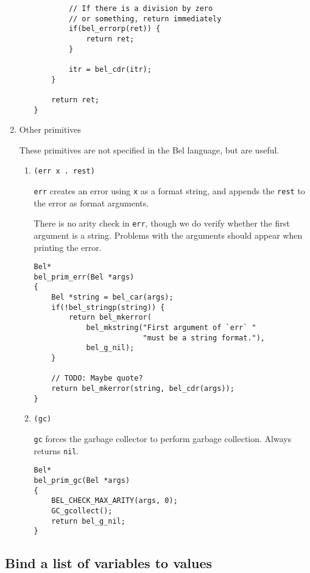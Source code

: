 \documentclass[openright,a4paper,twoside,12pt]{memoir}
\begin{document}
\begin{enumerate}
\begin{enumerate}
\begin{verbatim}
        // If there is a division by zero
        // or something, return immediately
        if(bel_errorp(ret)) {
            return ret;
        }
        
        itr = bel_cdr(itr);
    }

    return ret;
}
\end{verbatim}
\end{enumerate}

\item Other primitives
\label{sec:org4560922}

These primitives are not specified in the Bel language, but are useful.

\begin{enumerate}
\item \texttt{(err x . rest)}
\label{sec:orgdc2a7fe}

\texttt{err} creates an error using \texttt{x} as a format string, and appends the \texttt{rest}
to the error as format arguments.

There is no arity check in \texttt{err}, though we do verify whether the first
argument is a string. Problems with the arguments should appear when
printing the error.

\begin{verbatim}
Bel*
bel_prim_err(Bel *args)
{
    Bel *string = bel_car(args);
    if(!bel_stringp(string)) {
        return bel_mkerror(
            bel_mkstring("First argument of `err` "
                         "must be a string format."),
            bel_g_nil);
    }

    // TODO: Maybe quote?
    return bel_mkerror(string, bel_cdr(args));
}
\end{verbatim}

\item \texttt{(gc)}
\label{sec:orgecaa835}

\texttt{gc}    forces    the    garbage   collector    to    perform    garbage
collection. Always returns \texttt{nil}.

\begin{verbatim}
Bel*
bel_prim_gc(Bel *args)
{
    BEL_CHECK_MAX_ARITY(args, 0);
    GC_gcollect();
    return bel_g_nil;
}
\end{verbatim}
\end{enumerate}
\end{enumerate}

\subsection{Bind a list of variables to values}
\label{sec:orgc1c2e14}
\end{document}
